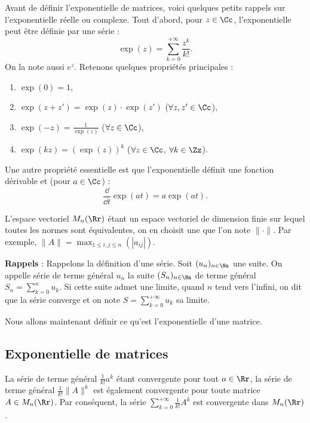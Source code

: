 \documentclass[12pt, class=report,crop=false]{standalone}
\begin{document}
Avant de définir l'exponentielle de matrices, voici quelques petits rappels sur l'exponentielle réelle ou complexe. Tout d'abord, pour $z \in \Cc$, l'exponentielle peut être définie par une série :
\[ \exp(z) = \sum_{k=0}^{+\infty} \frac{{z^k}}{k!}.\]
On la note aussi $e^z$. Retenons quelques propriétés principales :
\begin{enumerate}
  \item $\exp(0) =1$,
  \item $\exp(z+z') = \exp(z) \cdot \exp(z')$ ($\forall z,z' \in \Cc$),
  \item $\exp(-z) = \frac{1}{\exp(z)}$ ($\forall z \in \Cc$),
  \item $\exp(k z) = (\exp(z))^k$ ($\forall z \in \Cc$, $\forall k \in \Zz$).
\end{enumerate}


Une autre propriété essentielle est que l'exponentielle définit une fonction dérivable et (pour $a \in \Cc$) :
$$\frac{\dd}{\dd t} \exp(a t) = a \exp(at).$$




L'espace vectoriel $M_n(\Rr)$ étant un espace vectoriel de 
dimension finie sur lequel toutes les normes sont 
équivalentes, on en choisit une que l'on note $\| \cdot \|$.
Par exemple, $\| A \| = \max_{1\le i,j \le n}( |a_{ij} | )$.

\bigskip

{\bf Rappels} : Rappelons la définition d'une série. Soit 
$(u_n)_{n\in\Nn}$ une suite. On appelle série de terme 
général $u_n$ la suite $(S_n)_{n\in\Nn}$ de terme général 
$\displaystyle S_n=\sum_{k=0}^{n}u_k$. Si cette suite 
admet une limite, quand $n$ tend vers l'infini, on dit que la 
série converge et on note $\displaystyle S=\sum_{k=0}^{+\infty}u_k$ sa limite.


Nous allons maintenant définir ce qu'est l'exponentielle d'une matrice.





\subsection{Exponentielle de matrices}

La série de terme général ${\frac{1}{k!}}a^k$ étant convergente 
pour tout $a\in \Rr$, la série de terme général $\frac{1}{k!}\|A\|^k$ 
est également convergente pour toute matrice $A\in M_n(\Rr)$. 
Par conséquent, la série $\displaystyle \sum_{k=0}^{+\infty} \frac{1}{k!}A^k$ 
est convergente dans $M_n(\Rr)$.
\end{document}
